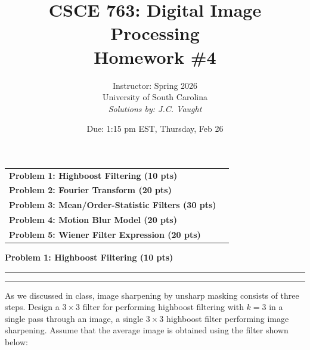 \documentclass[12pt]{article}
\title{CSCE 763: Digital Image Processing \\ Homework \#4}
\author{Instructor: Spring 2026 \\ University of South Carolina \\ \textit{Solutions by: J.C. Vaught}}
\date{Due: 1:15 pm EST, Thursday, Feb 26}
\newcommand{\question}[1]{%
  \clearpage
  \vspace{0.5cm}
  {\noindent\normalsize \textbf{#1}}
  \vspace{0.2cm}
  \hrule
  \vspace{0.1cm}
  \hrule
  \vspace{0.3cm}
}
\begin{document}
\maketitle
\setlength{\parindent}{0pt}



\begin{center}
\begin{tcolorbox}[colback=white, colframe=gray!50!black, colbacktitle=gray!20!white,
                  coltitle=black, sharp corners, boxrule=1pt,
                  title=\Large\bfseries Table of Contents]
\begin{tabular}{p{}r}
\textbf{Problem 1: Highboost Filtering (10 pts)} \dotfill & \textbf{\pageref{quest:1}} \\[0.3em]
\textbf{Problem 2: Fourier Transform (20 pts)} \dotfill & \textbf{\pageref{quest:2}} \\[0.3em]
\textbf{Problem 3: Mean/Order-Statistic Filters (30 pts)} \dotfill & \textbf{\pageref{quest:3}} \\[0.3em]
\textbf{Problem 4: Motion Blur Model (20 pts)} \dotfill & \textbf{\pageref{quest:4}} \\[0.3em]
\textbf{Problem 5: Wiener Filter Expression (20 pts)} \dotfill & \textbf{\pageref{quest:5}} \\
\end{tabular}
\vspace{0.2cm}
\end{tcolorbox}
\end{center}

\vspace{0.5cm}


\question{Problem 1: Highboost Filtering (10 pts)}\label{quest:1}

As we discussed in class, image sharpening by unsharp masking consists of three steps.
Design a $3 \times 3$ filter for performing highboost filtering with $k=3$ in a single pass through an image,
a single $3 \times 3$ highboost filter performing image sharpening. Assume that the average image is obtained
using the filter shown below:
\end{document}
